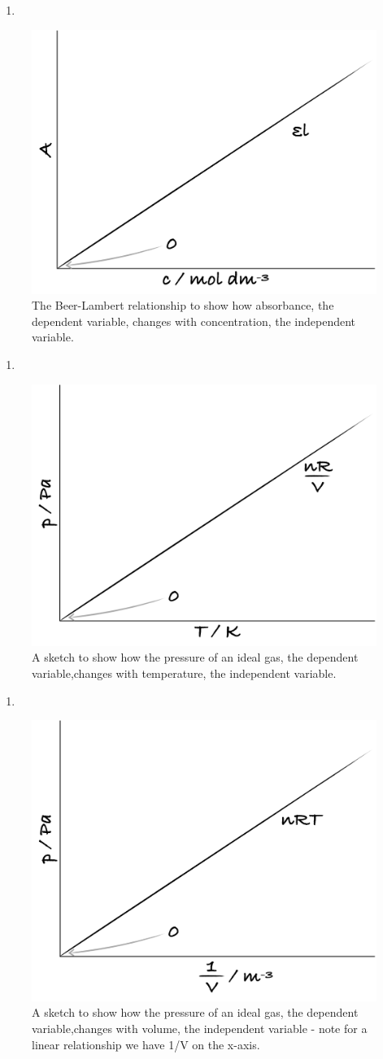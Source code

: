 \documentclass[
]{book}
\begin{document}
\begin{enumerate}
\def\labelenumi{\arabic{enumi}.}
\item
\end{enumerate}

\begin{figure}

{\centering \includegraphics[width=0.3\linewidth]{images/abssketch} 

}

\caption{The Beer-Lambert relationship to show how absorbance, the dependent variable, changes with concentration, the independent variable.}\label{fig:abs}
\end{figure}

\begin{enumerate}
\def\labelenumi{\arabic{enumi}.}
\setcounter{enumi}{1}
\item
\end{enumerate}

\begin{figure}

{\centering \includegraphics[width=0.3\linewidth]{images/pTsketch} 

}

\caption{A sketch to show how the pressure of an ideal gas, the dependent variable,changes with temperature, the independent variable.}\label{fig:pT}
\end{figure}

\begin{enumerate}
\def\labelenumi{\arabic{enumi}.}
\setcounter{enumi}{2}
\item
\end{enumerate}

\begin{figure}

{\centering \includegraphics[width=0.3\linewidth]{images/pVsketch} 

}

\caption{A sketch to show how the pressure of an ideal gas, the dependent variable,changes with volume, the independent variable - note for a linear relationship we have 1/V on the x-axis.}\label{fig:pV}
\end{figure}
\end{document}
